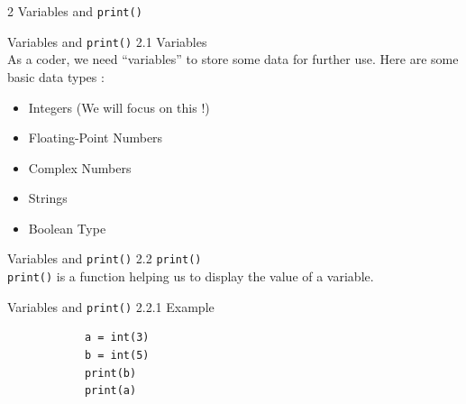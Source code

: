 \documentclass{beamer}
\begin{document}
    \begin{frame}[plain,c]
        \begin{center}
            {\color{blue} \LARGE 2 Variables and \texttt{print()}}
        \end{center}
        
    \end{frame}
    
    \begin{frame}{Variables and \texttt{print()}}
        \color{blue} \Large 2.1 Variables \\
        
        \color{black} \normalsize \vskip 10pt As a coder, we need ``variables'' to store some data for further use. 
        Here are some basic data types :
        \begin{itemize}
            \item Integers (We will focus on this !)
            \item Floating-Point Numbers
            \item Complex Numbers
            \item Strings
            \item Boolean Type
        \end{itemize}
        
    \end{frame}
    
    \begin{frame}{Variables and \texttt{print()}}
        \color{blue} \Large 2.2 \texttt{print()} \\
        \color{black} \normalsize \vskip 10pt \texttt{print()} is a function helping us to display the value of a variable.
        
    \end{frame}
    
    \begin{frame}[fragile]{Variables and \texttt{print()}}
        \color{blue} \Large 2.2.1 Example \\
        \color{black} \normalsize \vskip 10pt
        \begin{verbatim}
            a = int(3)
            b = int(5)
            print(b)
            print(a)
        \end{verbatim}

    \end{frame}
        
\end{document}

